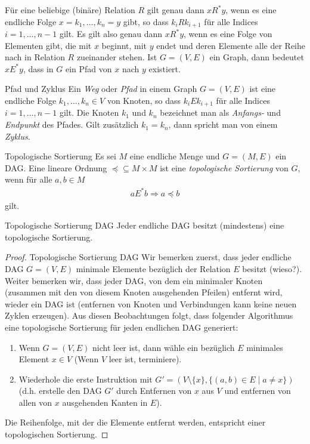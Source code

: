     \begin{remark}
        F\"ur eine beliebige (bin\"are) Relation $R$ gilt genau dann $xR^*y$, wenn es
        eine endliche Folge $x=k_1,\dots,k_n=y$ gibt, so dass $k_iRk_{i+1}$ f\"ur alle
        Indices $i=1,\dots,n-1$ gilt. Es gilt also genau dann $xR^*y$, wenn es eine Folge von
        Elementen gibt, die mit $x$ beginnt, mit $y$ endet und deren Elemente alle der Reihe
        nach in Relation $R$ zueinander stehen. Ist $G=(V,E)$ ein Graph, dann bedeutet
        $xE^*y$, dass in $G$ ein Pfad von $x$ nach $y$ existiert.
    \end{remark}

    \begin{definition} {Pfad und Zyklus}
        Ein \textit{Weg} oder \textit{Pfad} in einem Graph $G=(V,E)$ ist eine endliche Folge
        $k_1,\dots,k_n\in V$ von Knoten, so dass $k_iEk_{i+1}$ f\"ur alle Indices
        $i=1,\dots,n-1$ gilt. Die Knoten $k_1$ und $k_n$ bezeichnet man als \textit{Anfangs-}
        und \textit{Endpunkt} des Pfades. Gilt zusätzlich $k_1=k_n$, dann spricht man von einem \textit{Zyklus}.
    \end{definition}


    \begin{definition}{Topologische Sortierung}
        Es sei $M$ eine endliche Menge und $G=(M,E)$ ein DAG. Eine lineare Ordnung $\preceq\subseteq M\times M$ ist eine \textit{topologische Sortierung} von $G$, wenn für alle $a,b\in M$
        \begin{align*}
        a E^* b  \Rightarrow a\preceq b
        \end{align*}
        gilt.
    \end{definition}

    \begin{lemma}{Topologische Sortierung DAG}
        Jeder endliche DAG besitzt (mindestens) eine topologische Sortierung.
    \end{lemma}
    
    \begin{proof}{Topologische Sortierung DAG}
        Wir bemerken zuerst, dass jeder endliche DAG $G=(V,E)$ minimale Elemente bezüglich der Relation $E$ besitzt (wieso?). Weiter bemerken wir, dass jeder DAG, von dem ein minimaler Knoten (zusammen mit den von diesem Knoten ausgehenden Pfeilen) entfernt wird, wieder ein DAG ist (entfernen von Knoten und Verbindungen kann keine neuen Zyklen erzeugen). Aus diesen Beobachtungen folgt, dass folgender Algorithmus eine topologische Sortierung für jeden endlichen DAG generiert:
        \begin{enumerate}
            \item Wenn $G=(V,E)$ nicht leer ist, dann wähle ein bezüglich $E$ minimales Element $x\in V$ (Wenn $V$ leer ist, terminiere).
            \item Wiederhole die erste Instruktion mit $G'=(V\setminus \{x\},\{(a,b)\in E\mid a\neq x \})$ (d.h. erstelle den DAG $G'$ durch Entfernen von $x$ aus $V$ und entfernen von allen von $x$ ausgehenden Kanten in $E$).
        \end{enumerate}
    Die Reihenfolge, mit der die Elemente entfernt werden, entspricht einer topologischen Sortierung.
    \end{proof}


